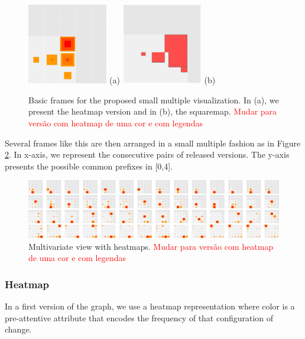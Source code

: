 \begin{figure}[htb]
  \centering
  \includegraphics[width=3.5cm]{images/techniquea.png} (a) 
  \includegraphics[width=3.53cm]{images/techniqueb.png} (b)
  \caption{Basic frames for the proposed small multiple visualization. In (a), we present the heatmap version and in (b), the squaremap. \textcolor{red}{Mudar para vers\~ao com heatmap de uma cor e com legendas}}
  \label{fig:technique}
\end{figure}

Several frames like this are then arranged in a small multiple fashion as in Figure \ref{fig:heatmap000}. In x-axis, we represent the consecutive pairs of released versions. The y-axis presents the possible common prefixes in [0,4]. 

\begin{figure}[htb]
  \centering
  \includegraphics[width=17cm]{images/heatmap000.png}
  \caption{Multivariate view with heatmaps. \textcolor{red}{Mudar para vers\~ao com heatmap de uma cor e com legendas}}
  \label{fig:heatmap000}
\end{figure}

\subsubsection{Heatmap}
\label{heatmap}

In a first version of the graph, we use a heatmap representation where color is a pre-attentive attribute that encodes the frequency of that configuration of change.


